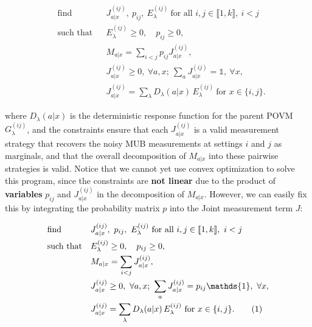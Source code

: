 \documentclass[oneside, a4paper, onecolumn, 11pt]{article}
\theoremstyle{definition}
\theoremstyle{plain}
\theoremstyle{remark}
\begin{document}
\begin{center}
\begin{align*}
&\text{find}      & & J_{a|x}^{(ij)},\ p_{ij},\ E_\lambda^{(ij)}\ \text{for all } i,j \in \llbracket 1,k \rrbracket,\ i<j \\
&\text{such that} & & E_\lambda^{(ij)} \geq 0,\quad p_{ij} \geq 0, \\
&                 & & M_{a|x} = \sum_{i<j} p_{ij} J_{a|x}^{(ij)}, \\
&                 & & J_{a|x}^{(ij)} \geq 0,\ \forall a,x;\ \sum_a J_{a|x}^{(ij)} = \mathds{1} ,\ \forall x, \\
&                 & & J_{a|x}^{(ij)} = \sum_\lambda D_\lambda(a|x)\, E_\lambda^{(ij)}\ \text{for } x \in \{i,j\}.
\end{align*}
\end{center}
where $D_\lambda(a|x)$ is the deterministic response function for the parent POVM $G^{(ij)}_{\lambda}$, and the constraints ensure that each $J_{a|x}^{(ij)}$ is a valid measurement strategy that recovers the noisy MUB measurements at settings $i$ and $j$ as marginals, and that the overall decomposition of $M_{a|x}$ into these pairwise strategies is valid.
\newline
Notice that we cannot yet use convex optimization to solve this program, since the constraints are \textbf{not linear} due to the product of \textbf{variables} $p_{ij}$ and $J_{a|x}^{(ij)}$ in the decomposition of $M_{a|x}$.
However, we can easily fix this by integrating the probability matrix $p$ into the Joint measurement term $J$:


\begin{center}
\begin{align*}
&\text{find}      & & J_{a|x}^{(ij)},\ p_{ij},\ E_\lambda^{(ij)}\ \text{for all } i,j \in \llbracket 1,k \rrbracket,\ i<j \\
&\text{such that} & & E_\lambda^{(ij)} \geq 0,\quad p_{ij} \geq 0, \\
&                 & & M_{a|x} = \sum_{i<j} J_{a|x}^{(ij)}, \\
&                 & & J_{a|x}^{(ij)} \geq 0,\ \forall a,x;\ \sum_a J_{a|x}^{(ij)} = p_{ij} \mathds{1} ,\ \forall x, \\
&                 & & J_{a|x}^{(ij)} = \sum_\lambda D_\lambda(a|x)\, E_\lambda^{(ij)}\ \text{for } x \in \{i,j\}.
   \refstepcounter{equation}\tag{\theequation}\label{eq:joint-decomp}
\end{align*}
\end{center}
\end{document}
